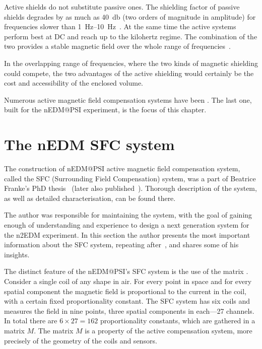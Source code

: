 Active shields do not substitute passive ones. The shielding factor
 of passive shields degrades by as much as \SI{40}{\decibel} (two orders of magnitude in amplitude) for frequencies slower than \SIrange[range-phrase = --]{1}{10}{\hertz}~\cite{Brake1991}. At the same time the active systems perform best at DC and reach up to the kilohertz regime. The combination of the two provides a stable magnetic field over the whole range of frequencies~\cite{Kelha1982,Brake1991,Voigt2013}.

In the overlapping range of frequencies, where the two kinds of magnetic shielding could compete, the two advantages of the active shielding would certainly be the cost and accessibility of the enclosed volume. 

Numerous active magnetic field compensation systems have been \cite{Kelha1982,Brake1991,RetaHernandez1998,Spemann2003,Brys2005,Kobayashi2012,Voigt2013,Afach2014}. The last one, built for the nEDM@PSI experiment, is the focus of this chapter.


\section{The nEDM SFC system}
The construction of nEDM@PSI active magnetic field compensation system, called the SFC (Surrounding Field Compensation) system,
was a part of Beatrice Franke's PhD thesis~\cite{Franke2013} (later also published~\cite{Afach2014}). Thorough description of the system, as well as detailed characterisation, can be found there.

The author was responsible for maintaining the system, with the goal of gaining enough of understanding and experience to design a next generation system for the n2EDM experiment. In this section the author presents the most important information about the SFC system, repeating after~\cite{Franke2013}, and shares some of his insights. 

The distinct feature of the nEDM@PSI's SFC system is the use of the matrix . Consider a single coil of any shape in air. For every point in space and for every spatial component the magnetic field is proportional to the current in the coil, with a certain fixed proportionality constant. The SFC system has six coils and measures the field in nine points, three spatial components in each---27 channels. In total there are $6 \times 27 = 162$ proportionality constants, which are gathered in a matrix $M$. The matrix $M$ is a property of the active compensation system, more precisely of the geometry of the coils and sensors. 

